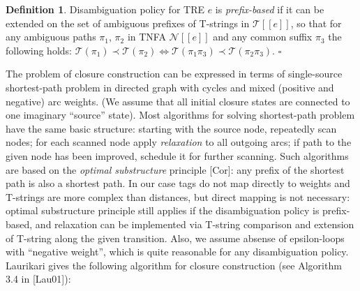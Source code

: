 \documentclass{article}
\newcommand{\Xlb}{[\![}
\newcommand{\Xrb}{]\!]}
\newcommand{\XN}{\mathcal{N}}
\newcommand{\XT}{\mathcal{T}}
\theoremstyle{definition}
\newtheorem{Xdef}{Definition}
\begin{document}
\begin{multicols}{2}
    \begin{Xdef}
    Disambiguation policy for TRE $e$ is \emph{prefix-based}
    if it can be extended on the set of ambiguous prefixes of T-strings in $\XT \Xlb e \Xrb$,
    so that for any ambiguous paths $\pi_1 $, $\pi_2 $ in TNFA $\XN \Xlb e \Xrb$
    and any common suffix $\pi_3$ the following holds:
    $\XT(\pi_1) \prec \XT(\pi_2) \Leftrightarrow \XT(\pi_1 \pi_3) \prec \XT(\pi_2 \pi_3)$.
    $\square$
    \end{Xdef}

The problem of closure construction can be expressed in terms of single-source shortest-path problem
in directed graph with cycles and mixed (positive and negative) arc weights.
(We assume that all initial closure states are connected to one imaginary ``source'' state).
Most algorithms for solving shortest-path problem have the same basic structure:
starting with the source node, repeatedly scan nodes;
for each scanned node apply \emph{relaxation} to all outgoing arcs;
if path to the given node has been improved, schedule it for further scanning.
Such algorithms are based on the \emph{optimal substructure} principle [Cor]:
any prefix of the shortest path is also a shortest path.
In our case tags do not map directly to weights and T-strings are more complex than distances, but direct mapping is not necessary:
optimal substructure principle still applies if the disambiguation policy is prefix-based,
and relaxation can be implemented via T-string comparison and extension of T-string along the given transition.
Also, we assume absense of epsilon-loops with ``negative weight'',
which is quite reasonable for any disambiguation policy.
Laurikari gives the following algorithm for closure construction (see Algorithm 3.4 in [Lau01]):
\\


\end{multicols}
\end{document}
